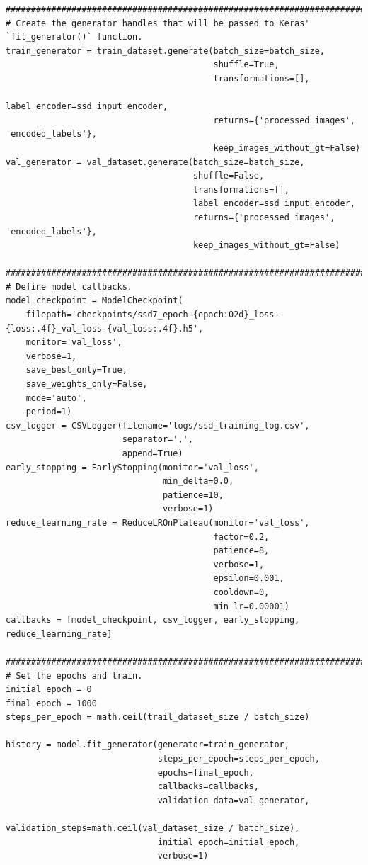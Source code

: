 \begin{lstlisting}
########################################################################################################################
# Create the generator handles that will be passed to Keras' `fit_generator()` function.
train_generator = train_dataset.generate(batch_size=batch_size,
                                         shuffle=True,
                                         transformations=[],
                                         label_encoder=ssd_input_encoder,
                                         returns={'processed_images', 'encoded_labels'},
                                         keep_images_without_gt=False)
val_generator = val_dataset.generate(batch_size=batch_size,
                                     shuffle=False,
                                     transformations=[],
                                     label_encoder=ssd_input_encoder,
                                     returns={'processed_images', 'encoded_labels'},
                                     keep_images_without_gt=False)

########################################################################################################################
# Define model callbacks.
model_checkpoint = ModelCheckpoint(
    filepath='checkpoints/ssd7_epoch-{epoch:02d}_loss-{loss:.4f}_val_loss-{val_loss:.4f}.h5',
    monitor='val_loss',
    verbose=1,
    save_best_only=True,
    save_weights_only=False,
    mode='auto',
    period=1)
csv_logger = CSVLogger(filename='logs/ssd_training_log.csv',
                       separator=',',
                       append=True)
early_stopping = EarlyStopping(monitor='val_loss',
                               min_delta=0.0,
                               patience=10,
                               verbose=1)
reduce_learning_rate = ReduceLROnPlateau(monitor='val_loss',
                                         factor=0.2,
                                         patience=8,
                                         verbose=1,
                                         epsilon=0.001,
                                         cooldown=0,
                                         min_lr=0.00001)
callbacks = [model_checkpoint, csv_logger, early_stopping, reduce_learning_rate]

########################################################################################################################
# Set the epochs and train.
initial_epoch = 0
final_epoch = 1000
steps_per_epoch = math.ceil(trail_dataset_size / batch_size)

history = model.fit_generator(generator=train_generator,
                              steps_per_epoch=steps_per_epoch,
                              epochs=final_epoch,
                              callbacks=callbacks,
                              validation_data=val_generator,
                              validation_steps=math.ceil(val_dataset_size / batch_size),
                              initial_epoch=initial_epoch,
                              verbose=1)


\end{lstlisting}
